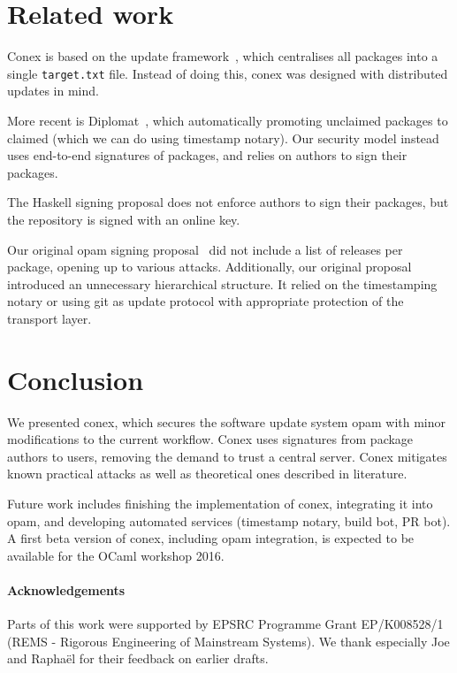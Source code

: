 \documentclass[nocopyrightspace]{sigplanconf}
\begin{document}
\section{Related work} \label{sec:related}
Conex is based on the update framework~\cite{tuf}, which centralises all packages into a single \texttt{target.txt} file.
Instead of doing this, conex was designed with distributed updates in mind.

More recent is Diplomat~\cite{diplomat}, which automatically promoting unclaimed packages to claimed (which we can do using timestamp notary).
Our security model instead uses end-to-end signatures of packages, and relies on authors to sign their packages.

The Haskell signing proposal does not enforce authors to sign their packages, but the repository is signed with an online key.

Our original opam signing proposal~\cite{opamsigning} did not include a list of releases per package, opening up to various attacks.
Additionally, our original proposal introduced an unnecessary hierarchical structure.
It relied on the timestamping notary or using git as update protocol with appropriate protection of the transport layer.

\section{Conclusion} \label{sec:conclusion}
We presented conex, which secures the software update system opam with minor modifications to the current workflow.
Conex uses signatures from package authors to users, removing the demand to trust a central server.
Conex mitigates known practical attacks as well as theoretical ones described in literature.

Future work includes finishing the implementation of conex, integrating it into opam, and developing automated services (timestamp notary, build bot, PR bot).
A first beta version of conex, including opam integration, is expected to be available for the OCaml workshop 2016.

\paragraph{Acknowledgements} Parts of this work were supported by EPSRC Programme Grant EP/K008528/1 (REMS - Rigorous Engineering of Mainstream Systems).  We thank especially Joe and Rapha\"el for their feedback on earlier drafts.



\end{document}
